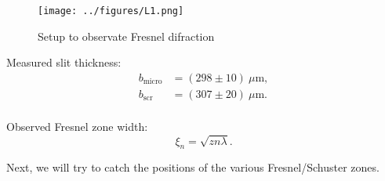 \begin{figure}[h]
    \centering
    \texttt{[image: ../figures/L1.png]}
    \caption{Setup to observate Fresnel difraction}
\end{figure}


\begin{minipage}[t]{0.48\textwidth}
    Measured slit thickness:
    \begin{align*}
        b_{\text{micro}} &= (298 \pm 10) \ \mu\text{m}, \\
        b_{\text{scr}} &= (307 \pm 20) \ \mu\text{m}. \\
    \end{align*}
\end{minipage}
\hfill
\begin{minipage}[t]{0.48\textwidth}
    Observed  Fresnel zone width:
    \begin{equation*}
        \xi_n = \sqrt{z n \lambda}.
    \end{equation*}
\end{minipage}

Next, we will try to catch the positions of the various Fresnel/Schuster zones.